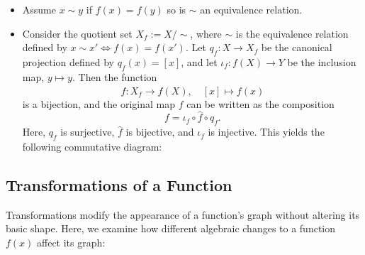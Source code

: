 \begin{itemize}

	\item Assume $x \sim y $ if $f(x)= f(y)$ so is $\sim$ an equivalence relation.

	\item Consider the quotient set \( X_f := X/\sim \), where \( \sim \) is the equivalence relation defined by \( x \sim x' \iff f(x) = f(x') \). Let \( q_f : X \to X_f \) be the canonical projection defined by \( q_f(x) = [x] \), and let \( \iota_f : f(X) \to Y \) be the inclusion map, \( y \mapsto y \). Then the function
	      \[
		      \hat{f} : X_f \to f(X), \quad [x] \mapsto f(x)
	      \]
	      is a bijection, and the original map \( f \) can be written as the composition
	      \[
		      f = \iota_f \circ \hat{f} \circ q_f.
	      \]
	      Here, \( q_f \) is surjective, \( \hat{f} \) is bijective, and \( \iota_f \) is injective. This yields the following commutative diagram:
	      \begin{center}
	      \end{center}

\end{itemize}

\subsection{Transformations of a Function}

Transformations modify the appearance of a function's graph without altering its basic shape.
Here, we examine how different algebraic changes to a function \( f(x) \) affect its graph:

